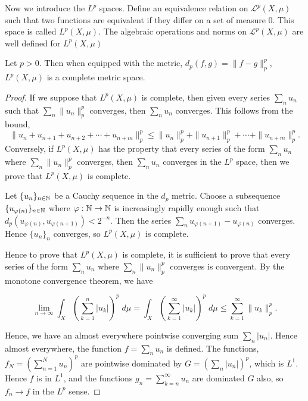 \documentclass{owmaths}
\begin{document}
Now we introduce the $L^p$ spaces. Define an equivalence
relation on $\mathcal{L}^p(X,\mu)$ such that two
functions are equivalent if they differ on a set of measure $0$.
This space is called $L^p(X,\mu)$. The algebraic operations and norms
on $\mathcal{L}^p(X,\mu)$ are well defined for $L^p(X,\mu)$

\begin{proposition}
    Let $p > 0$. Then when equipped with the metric,
    $d_p(f,g) = \|f-g\|_p^p$, $L^p(X,\mu)$ is a complete metric space.
\end{proposition}
\begin{proof}
    If we suppose that $L^p(X,\mu)$ is complete, then given every series
    $\sum_n u_n$ such that $\sum_n \|u_n\|_p^p$ converges, then $\sum_{n} u_n$
    converges. This follows from the bound,
    \begin{equation*}
        \|u_n + u_{n+1} + u_{n+2} + \cdots + u_{n+m}\|^p_p \leq \|u_n\|_p^p + \|u_{n+1}\|_p^p + \cdots + \|u_{n+m}\|_p^p.
    \end{equation*}
    Conversely, if $L^p(X,\mu)$ has the property that every series of the form
    $\sum_{n} u_n$ where $\sum_{n} \|u_n\|_p^p$ converges, then $\sum_{n} u_n$
    converges in the $L^p$ space, then we prove that $L^p(X,\mu)$ is complete.
    
    Let $\{u_n\}_{n\in \mathbb{N}}$ be a Cauchy sequence in the $d_p$ metric. Choose
    a subsequence $\{u_{\varphi(n)}\}_{n\in\mathbb{N}}$ where $\varphi:\mathbb{N}\rightarrow\mathbb{N}$
    is increasingly rapidly enough such that $d_p(u_{\varphi(n)},u_{\varphi(n+1)}) < 2^{-n}$. 
    Then the series $\sum_{n} u_{\varphi(n+1)}-u_{\varphi(n)}$ converges. Hence $\{u_n\}_n$
    converges, so $L^p(X,\mu)$ is complete.
    
    
    Hence to prove that $L^p(X,\mu)$ is complete, it is sufficient to prove that every
    series of the form $\sum_n u_n$ where $\sum_n \|u_n\|_p^p$ converges
    is convergent. By the monotone convergence theorem, we have
    
    \begin{equation*}
        \lim_{n\rightarrow\infty} \int_X \left(\sum_{k=1}^n |u_k|\right)^p\;d\mu = \int_X \left(\sum_{k=1}^\infty|u_k|\right)^p\;d\mu \leq \sum_{k=1}^\infty \|u_k\|_p^p.
    \end{equation*}
    
    Hence, we have an almost everywhere pointwise converging sum $\sum_{n} |u_n|$. Hence
    almost everywhere, the function $f = \sum_{n} u_n$ is defined. The functions,
    $f_N = \left(\sum_{n=1}^N u_n\right)^p$ are pointwise dominated by $G = \left(\sum_{n} |u_n|\right)^p$,
    which is $L^1$. Hence $f$ is in $L^1$, and the functions $g_n = \sum_{k=n}^\infty u_n$
    are dominated $G$ also, so $f_n\rightarrow f$ in the $L^p$ sense.
\end{proof}
\end{document}
